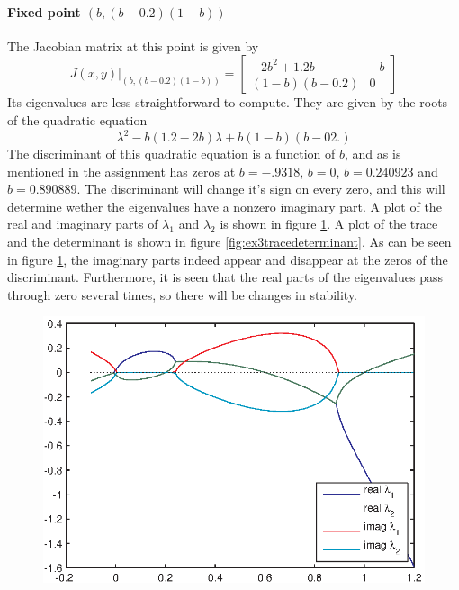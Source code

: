\paragraph{Fixed point $(b,(b-0.2)(1-b))$}\hfill\newline
The Jacobian matrix at this point is given by 
\begin{equation}
J(x,y)|_{(b,(b-0.2)(1-b))}=\begin{bmatrix}
-2b^2+1.2b & -b \\
(1-b)(b-0.2) & 0
\end{bmatrix}
\end{equation}
Its eigenvalues are less straightforward to compute. They are given by the roots of the quadratic equation 
\begin{equation}
\lambda^2-b(1.2-2b)\lambda+b(1-b)(b-02.)
\end{equation}
The discriminant of this quadratic equation is a function of $b$, and as is mentioned in the assignment has zeros at $b=-.9318$, $b=0$, $b=0.240923$ and $b=0.890889$. The discriminant will change it's sign on every zero, and this will determine wether the eigenvalues have a nonzero imaginary part. A plot of the real and imaginary parts of $\lambda_1$ and $\lambda_2$ is shown in figure \ref{fig:ex3eigvalues}. A plot of the trace and the determinant is shown in figure \ref{fig:ex3tracedeterminant}. As can be seen in figure \ref{fig:ex3eigvalues}, the imaginary parts indeed appear and disappear at the zeros of the discriminant. Furthermore, it is seen that the real parts of the eigenvalues pass through zero several times, so there will be changes in stability.
\begin{figure}[htp]
\centering
\includegraphics{img/ex3/eigvalues.eps}
\caption{}
\label{fig:ex3eigvalues}
\end{figure}
